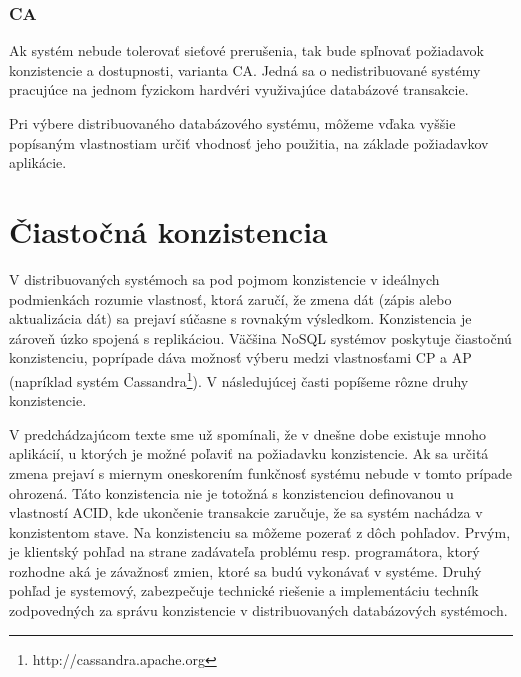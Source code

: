 \documentclass[11pt,twoside,a4paper]{book}
\begin{document}
\subsubsection*{CA}
Ak systém nebude tolerovať sieťové prerušenia, tak bude spľnovať požiadavok konzistencie a dostupnosti, varianta CA. Jedná sa o nedistribuované systémy pracujúce na jednom fyzickom hardvéri využivajúce databázové transakcie.


Pri výbere distribuovaného databázového systému, môžeme vďaka vyššie popísaným vlastnostiam určiť vhodnosť jeho použitia, na základe požiadavkov aplikácie.
%




\section{Čiastočná konzistencia}
V distribuovaných systémoch sa pod pojmom konzistencie v ideálnych podmienkách rozumie vlastnosť, ktorá zaručí, že zmena dát (zápis alebo aktualizácia dát) sa prejaví súčasne s rovnakým výsledkom. Konzistencia je zároveň úzko spojená s replikáciou. Väčšina NoSQL systémov poskytuje čiastočnú konzistenciu, poprípade dáva možnosť výberu medzi vlastnosťami CP a AP (napríklad systém Cassandra\footnote{http://cassandra.apache.org}). V následujúcej časti popíšeme rôzne druhy konzistencie.

V predchádzajúcom texte sme už spomínali, že v dnešne dobe existuje mnoho aplikácií, u ktorých je možné poľaviť na požiadavku konzistencie. Ak sa určitá zmena prejaví s miernym oneskorením funkčnosť systému nebude v tomto prípade ohrozená. Táto konzistencia nie je totožná s konzistenciou definovanou u vlastností ACID, kde ukončenie transakcie zaručuje, že sa systém nachádza v konzistentom stave. Na konzistenciu sa môžeme pozerať z dôch pohľadov. Prvým, je klientský pohľad na strane zadávateľa problému resp. programátora, ktorý rozhodne aká je závažnosť zmien, ktoré sa budú vykonávať v systéme. Druhý pohľad je systemový, zabezpečuje technické riešenie a implementáciu techník zodpovedných za správu konzistencie v distribuovaných databázových systémoch.
\end{document}
